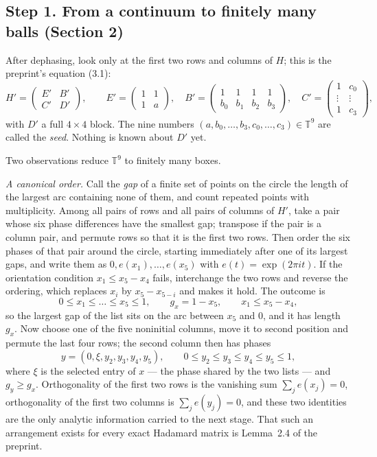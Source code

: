 \documentclass[11pt]{article}
\theoremstyle{definition}
\theoremstyle{plain}
\theoremstyle{definition}
\begin{document}
\subsection*{Step 1. From a continuum to finitely many balls (Section 2)}

After dephasing, look only at the first two rows and columns of $H$; this is the preprint's
equation (3.1):
\[
H'=\begin{pmatrix}E'&B'\\ C'&D'\end{pmatrix},\qquad
E'=\begin{pmatrix}1&1\\1&a\end{pmatrix},\quad
B'=\begin{pmatrix}1&1&1&1\\ b_0&b_1&b_2&b_3\end{pmatrix},\quad
C'=\begin{pmatrix}1&c_0\\ \vdots&\vdots\\ 1&c_3\end{pmatrix},
\]
with $D'$ a full $4\times4$ block. The nine numbers $(a,b_0,\dots,b_3,c_0,\dots,c_3)\in\mathbb T^9$
are called the \emph{seed}. Nothing is known about $D'$ yet.

Two observations reduce $\mathbb T^9$ to finitely many boxes.

\emph{A canonical order.} Call the \emph{gap} of a finite set of points on the circle the length of
the largest arc containing none of them, and count repeated points with multiplicity. Among all pairs
of rows and all pairs of columns of $H'$, take a pair whose six phase differences have the smallest
gap; transpose if the pair is a column pair, and permute rows so that it is the first two rows. Then
order the six phases of that pair around the circle, starting immediately after one of its largest
gaps, and write them as $0,e(x_1),\dots,e(x_5)$ with $e(t)=\exp(2\pi i t)$. If the orientation
condition $x_1\le x_5-x_4$ fails, interchange the two rows and reverse the ordering, which replaces
$x_i$ by $x_5-x_{5-i}$ and makes it hold. The outcome is
\[
0\le x_1\le\dots\le x_5\le 1,\qquad g_x=1-x_5,\qquad x_1\le x_5-x_4 ,
\]
so the largest gap of the list sits on the arc between $x_5$ and $0$, and it has length $g_x$. Now
choose one of the five noninitial columns, move it to second position and permute the last four rows;
the second column then has phases
\[
y=(0,\xi,y_2,y_3,y_4,y_5),\qquad 0\le y_2\le y_3\le y_4\le y_5\le1,
\]
where $\xi$ is the selected entry of $x$ --- the phase shared by the two lists --- and $g_y\ge g_x$.
Orthogonality of the first two rows is the vanishing sum $\sum_{j}e(x_j)=0$, orthogonality of the
first two columns is $\sum_j e(y_j)=0$, and these two identities are the only analytic information
carried to the next stage. That such an arrangement exists for every exact Hadamard matrix is
Lemma~2.4 of the preprint.
\end{document}
